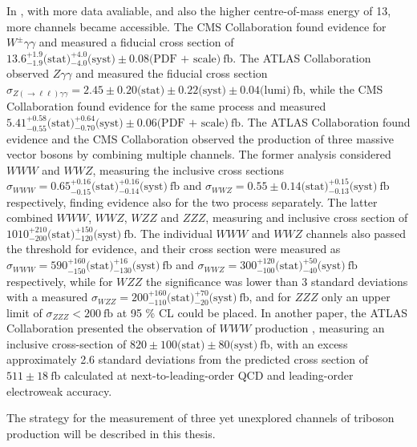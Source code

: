 In \RunII, with more data avaliable, and also the higher centre-of-mass energy of 13\TeV, more channels became accessible.
The CMS Collaboration found evidence for $W^\pm\gamma\gamma$ \cite{SMP-19-013} and measured a fiducial cross section of
$13.6^{+1.9}_{-1.9} \text{(stat)} {}^{+4.0}_{-4.0} \text{(syst)} \pm 0.08 \text{(PDF + scale)}~\text{fb}$.
The ATLAS Collaboration observed $Z\gamma\gamma$ \cite{STDM-2021-09} and measured the fiducial cross section $\sigma_{Z(\rightarrow \ell\ell)\gamma\gamma} = 2.45 \pm 0.20 \text{(stat)} \pm 0.22 \text{(syst)} \pm 0.04 \text{(lumi)}~\text{fb}$,
while the CMS Collaboration found evidence for the same process \cite{SMP-19-013} and measured $5.41^{+0.58}_{-0.55} \text{(stat)} {}^{+0.64}_{-0.70} \text{(syst)} \pm 0.06 \text{(PDF + scale)}~\text{fb}$.
The ATLAS Collaboration found evidence \cite{STDM-2017-22} and the CMS Collaboration observed \cite{SMP-19-014} the production of three massive vector bosons by combining multiple channels.
The former analysis considered $WWW$ and $WWZ$, measuring the inclusive cross sections
$\sigma_{WWW} = 0.65^{+0.16}_{-0.15} \text{(stat)} {}^{+0.16}_{-0.14} \text{(syst)}~\text{fb}$ and
$\sigma_{WWZ} = 0.55 \pm 0.14 \text{(stat)} {}^{+0.15}_{-0.13} \text{(syst)}~\text{fb}$ respectively,
finding evidence also for the two process separately.
The latter combined $WWW$, $WWZ$, $WZZ$ and $ZZZ$, measuring and inclusive cross section of $1010^{+210}_{-200}\text{(stat)}{}^{+150}_{-120}\text{(syst)}~\text{fb}$.
The individual $WWW$ and $WWZ$ channels also passed the threshold for evidence, and their cross section were measured as
$\sigma_{WWW} = 590 ^{+160}_{-150} \text{(stat)} {}^{+16}_{-130} \text{(syst)}~\text{fb}$ and
$\sigma_{WWZ} = 300 ^{+120}_{-100} \text{(stat)} {}^{+50}_{-40 } \text{(syst)}~\text{fb}$
respectively, while for $WZZ$ the significance was lower than 3 standard deviations with a measured
$\sigma_{WZZ} = 200 ^{+160}_{-110} \text{(stat)} {}^{+70}_{-20 } \text{(syst)}~\text{fb}$,
and for $ZZZ$ only an upper limit of $\sigma_{ZZZ} < 200~\text{fb}$ at 95 \% CL could be placed.
In another paper, the ATLAS Collaboration presented the observation of $WWW$ production \cite{HDBS-2019-16},
measuring an inclusive cross-section of $820 \pm 100 \text{(stat)} \pm 80 \text{(syst)}~\text{fb}$,
with an excess approximately 2.6 standard deviations from the predicted cross section of $511 \pm 18~\text{fb}$ calculated at next-to-leading-order QCD and leading-order electroweak accuracy.

The strategy for the measurement of three yet unexplored channels of triboson production will be described in this thesis.


